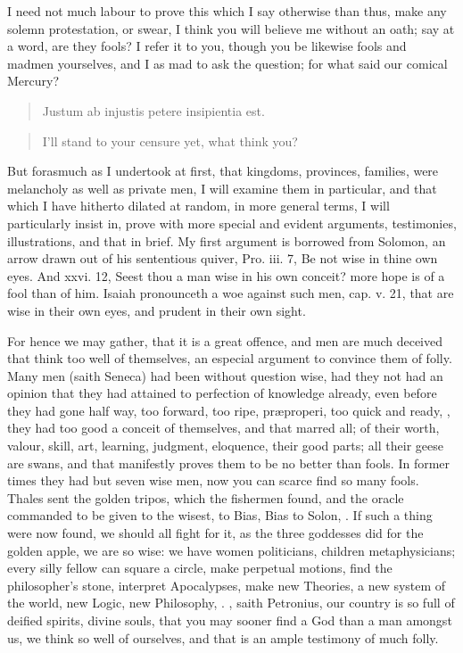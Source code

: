 {I need not much labour to prove this which I say otherwise than thus,
make any solemn protestation, or swear, I think you will believe me
without an oath; say at a word, are they fools? I refer it to you,
though you be likewise fools and madmen yourselves, and I as mad to ask
the question; for what said our comical Mercury?

\begin{verse}
\textlatin{Justum ab injustis petere insipientia est.}
\end{verse}

\begin{verse}
I'll stand to your censure yet, what think you?
\end{verse}

But forasmuch as I undertook at first, that kingdoms, provinces,
families, were melancholy as well as private men, I will examine them
in particular, and that which I have hitherto dilated at random, in
more general terms, I will particularly insist in, prove with more
special and evident arguments, testimonies, illustrations, and that in
brief.  My first
argument is borrowed from Solomon, an arrow drawn out of his
sententious quiver, Pro. iii. 7, Be not wise in thine own eyes. And
xxvi. 12, Seest thou a man wise in his own conceit? more hope is of a
fool than of him. Isaiah pronounceth a woe against such men, cap. v.
21, that are wise in their own eyes, and prudent in their own sight.

For hence we may gather, that it is a great offence, and men are much
deceived that think too well of themselves, an especial argument to
convince them of folly. Many men (saith Seneca) had been without
question wise, had they not had an opinion that they had attained to
perfection of knowledge already, even before they had gone half way,
too forward, too ripe, pr\ae{}properi, too quick and ready, , they had too good a conceit of
themselves, and that marred all; of their worth, valour, skill, art,
learning, judgment, eloquence, their good parts; all their geese are
swans, and that manifestly proves them to be no better than fools. In
former times they had but seven wise men, now you can scarce find so
many fools. Thales sent the golden tripos, which the fishermen found,
and the oracle commanded to be  given to the wisest, to Bias, Bias
to Solon, \etc{}. If such a thing were now found, we should all fight for
it, as the three goddesses did for the golden apple, we are so wise: we
have women politicians, children metaphysicians; every silly fellow can
square a circle, make perpetual motions, find the philosopher's stone,
interpret Apocalypses, make new Theories, a new system of the world,
new Logic, new Philosophy, \etc{}. , saith
Petronius, our country is so full of deified spirits, divine
souls, that you may sooner find a God than a man amongst us, we think
so well of ourselves, and that is an ample testimony of much folly.

}
